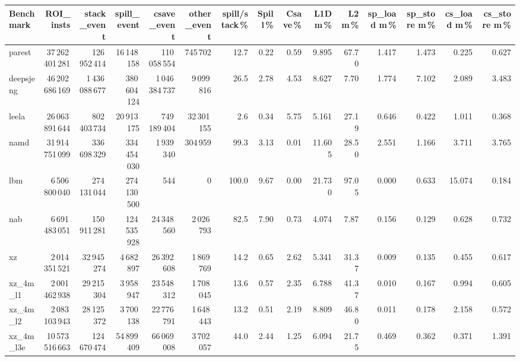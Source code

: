 \documentclass[9pt,landscape,a4paper]{article}
\begin{document}
\vspace{2mm}
\centering
\begin{adjustbox}{max width=\textwidth, max totalheight=0.50\textheight}%
\begin{tabular}{lrrrrrrrrrrrrrr}
\toprule
Benchmark & ROI\_insts & stack\_event & \textbf{spill\_event} & csave\_event & other\_event & spill/stack\,\% & Spill\,\% & Csave\,\% & L1D m\,\% & L2 m\,\% & sp\_load m\,\% & sp\_store m\,\% & cs\_load m\,\% & cs\_store m\,\% \\
\midrule
parest & 37\,262\,401\,281 & 126\,952\,414 & 16\,148\,158 & 110\,058\,554 & 745\,702 & 12.7 & 0.22 & 0.59 & 9.895 & 67.70 & 1.417 & 1.473 & 0.225 & 0.627 \\
deepsjeng & 46\,202\,686\,169 & 1\,436\,088\,677 & 380\,604\,124 & 1\,046\,384\,737 & 9\,099\,816 & 26.5 & 2.78 & 4.53 & 8.627 & 7.70 & 1.774 & 7.102 & 2.089 & 3.483 \\
leela & 26\,063\,891\,644 & 802\,403\,734 & 20\,913\,175 & 749\,189\,404 & 32\,301\,155 & 2.6 & 0.34 & 5.75 & 5.161 & 27.19 & 0.646 & 0.422 & 1.011 & 0.368 \\
namd & 31\,914\,751\,099 & 336\,698\,329 & 334\,454\,030 & 1\,939\,340 & 304\,959 & 99.3 & 3.13 & 0.01 & 11.605 & 28.50 & 2.551 & 1.166 & 3.711 & 3.765 \\
lbm & 6\,506\,800\,040 & 274\,131\,044 & 274\,130\,500 & 544 & 0 & 100.0 & 9.67 & 0.00 & 21.730 & 97.05 & 0.000 & 0.633 & 15.074 & 0.184 \\
nab & 6\,691\,483\,051 & 150\,911\,281 & 124\,535\,928 & 24\,348\,560 & 2\,026\,793 & 82.5 & 7.90 & 0.73 & 4.074 & 7.87 & 0.156 & 0.129 & 0.628 & 0.732 \\
xz & 2\,014\,351\,521 & 32\,945\,274 & 4\,682\,897 & 26\,392\,608 & 1\,869\,769 & 14.2 & 0.65 & 2.62 & 5.341 & 31.37 & 0.009 & 0.135 & 0.455 & 0.617 \\
xz\_4m\_l1 & 2\,001\,462\,938 & 29\,215\,304 & 3\,958\,947 & 23\,548\,312 & 1\,708\,045 & 13.6 & 0.57 & 2.35 & 6.788 & 41.37 & 0.010 & 0.167 & 0.994 & 0.605 \\
xz\_4m\_l2 & 2\,083\,103\,943 & 28\,125\,372 & 3\,700\,138 & 22\,776\,791 & 1\,648\,443 & 13.2 & 0.51 & 2.19 & 8.809 & 46.80 & 0.011 & 0.178 & 2.158 & 0.572 \\
xz\_4m\_l3e & 10\,573\,516\,663 & 124\,670\,474 & 54\,899\,409 & 66\,069\,008 & 3\,702\,057 & 44.0 & 2.44 & 1.25 & 6.094 & 21.75 & 0.469 & 0.362 & 0.371 & 1.391 \\

\end{tabular}
\end{adjustbox}
\end{document}
